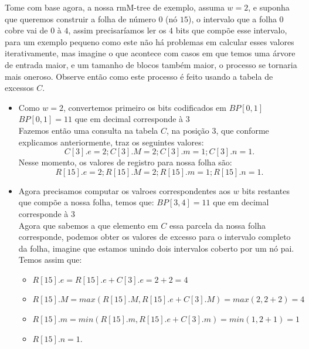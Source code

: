 \begin{example}
    Tome com base agora, a nossa rmM-tree de exemplo, assuma $w=2$, e suponha que queremos construir a folha de número $0$ (nó $15$), 
    o intervalo que a folha $0$ cobre vai de $0$ à $4$, assim precisaríamos ler os $4$ bits que compõe esse intervalo, para um exemplo pequeno como 
    este não há problemas em calcular esses valores iterativamente, mas imagine o que acontece com casos em que temos uma árvore de entrada maior, 
    e um tamanho de  blocos também maior, o processo se tornaria mais oneroso. Observe então como este processo é feito usando a tabela de excessos $C$.


    \begin{itemize}
        \item Como $w=2$, convertemos primeiro os bits codificados em $BP[0,1]$\\
        $BP[0,1] = 11$ que em decimal corresponde à $3$\\
        Fazemos então uma consulta na tabela $C$, na posição $3$, que conforme explicamos anteriormente, traz os seguintes valores:
        $$C[3].e = 2; C[3].M = 2; C[3].m = 1; C[3].n=1.$$
        Nesse momento, os valores de registro para nossa folha são:\\
        $$R[15].e = 2; R[15].M = 2; R[15].m = 1; R[15].n=1.$$
        \item  Agora precisamos computar os valroes correspondentes aos $w$ bits restantes que compõe a nossa folha, temos que:
        $BP[3,4] = 11$ que em decimal corresponde à $3$\\

        Agora que sabemos a que elemento em $C$ essa parcela da nossa folha corresponde, podemos obter os valores de excesso para o intervalo completo da folha,
        imagine que estamos unindo dois intervalos coberto por um nó pai. Temos assim que:
        \begin{itemize}
            \item $R[15].e = R[15].e + C[3].e = 2 + 2 = 4$
            \item $R[15].M = max(R[15].M, R[15].e + C[3].M) =  max(2,2+2) =4$
            \item $R[15].m = min(R[15].m, R[15].e + C[3].m) = min(1,2+1) = 1$
            \item $R[15].n=1.$
        \end{itemize}
    \end{itemize}
\end{example}


